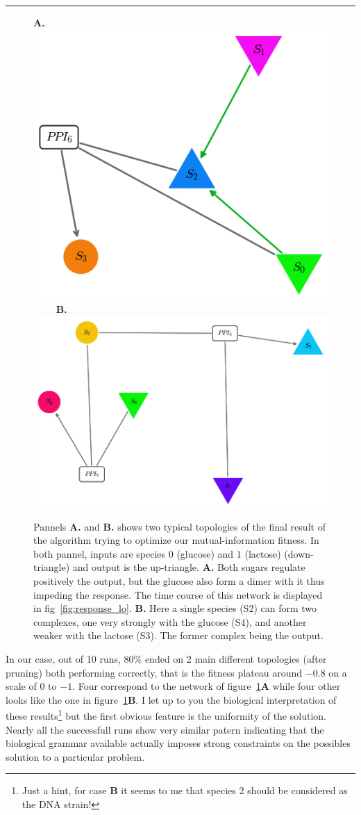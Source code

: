 \documentclass[]{article}
\begin{document}
\begin{center}\rule{0.5\linewidth}{\linethickness}\end{center}

\begin{figure}
\centering
{\bf A.}\includegraphics[width=.3\textwidth]{p2_network}
~~~~
{\bf B.}\includegraphics[width=.4\textwidth]{p31_network}
\caption{Pannels {\bf A.} and {\bf B.} shows two typical topologies of the final result
of the algorithm trying to optimize our mutual-information fitness. In both pannel,
inputs are species $0$ (glucose) and $1$ (lactose) (down-triangle) and output is the up-triangle.
{\bf A.} Both sugars regulate positively the output, but the glucose also form a
dimer with it thus impeding the response. The time course of this network is
displayed in fig~\ref{fig:response_lo}.
{\bf B.} Here a single species (S2) can form two complexes, one very strongly with
the glucose (S4), and another weaker with the lactose (S3). The former complex being the
output.}
\label{fig:network_lo}
\end{figure}

In our case, out of 10 runs, 80\% ended on 2 main different topologies (after
pruning) both performing correctly, that is the fitness plateau around 
$-0.8$ on a scale of $0$ to $-1$. Four correspond to the network of
figure~\ref{fig:network_lo}{\bf A} while four other looks like the one in
figure~\ref{fig:network_lo}{\bf B}. I let up to you the biological
interpretation of these results\footnote{Just a hint, for case {\bf B} 
it seems to me that species 2 should be considered as the DNA strain!}
but the first obvious feature is the uniformity of the solution. Nearly
all the successfull runs show very similar patern indicating that the
biological grammar available actually imposes strong constraints on the
possibles solution to a particular problem.
\end{document}

